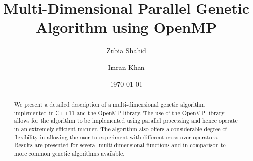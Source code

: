 \documentclass[aps,prl,preprint,groupedaddress,showkeys, nobibnotes]{revtex4-1}
\begin{document}

\title{Multi-Dimensional Parallel Genetic Algorithm using OpenMP}


\author{Zubia Shahid}

\author{Imran Khan}



\date{\today}

\begin{abstract}
We present a detailed description of a multi-dimensional genetic algorithm implemented in C++11 and the OpenMP library.  The use of the OpenMP library allows for the algorithm to be implemented using parallel processing and hence operate in an extremely efficient manner.  The algorithm also offers a considerable degree of flexibility in allowing the user to experiment with different cross-over operators.  Results are presented for several multi-dimensional functions and in comparison to more common genetic algorithms available. 
\end{abstract}

\pacs{}
\end{document}

